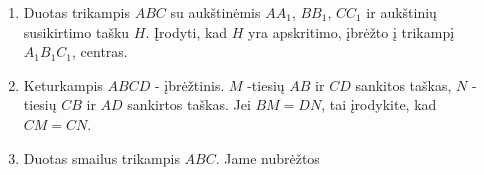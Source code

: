 \begin{enumerate}
\item Duotas trikampis $ABC$ su aukštinėmis $AA_1$, $BB_1$,
  $CC_1$ ir aukštinių susikirtimo tašku $H$. Įrodyti, kad
  $H$ yra apskritimo, įbrėžto į trikampį $A_1B_1C_1$,
  centras.
\item Keturkampis $ABCD$ - įbrėžtinis. $M$ -tiesių $AB$ ir
  $CD$ sankitos taškas, $N$ - tiesių $CB$ ir $AD$ sankirtos
  taškas. Jei $BM=DN$, tai įrodykite, kad $CM=CN$. 
\item Duotas smailus trikampis $ABC$. Jame  nubrėžtos

\end{enumerate}
